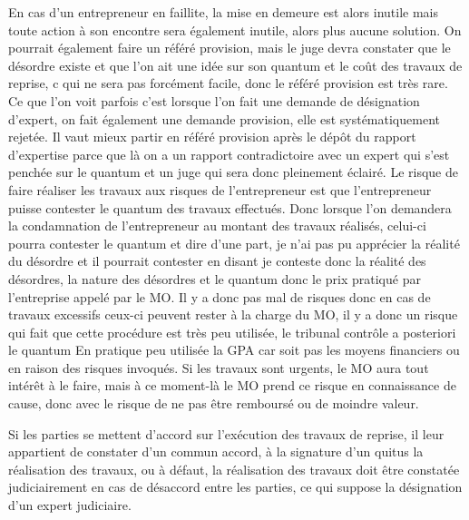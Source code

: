 				En cas d’un entrepreneur en faillite, la mise en demeure est alors inutile mais toute action à son encontre sera également inutile, alors plus aucune solution.
				On pourrait également faire un référé provision, mais le juge devra constater que le désordre existe et que l’on ait une idée sur son quantum et le coût des travaux de reprise, c qui ne sera pas forcément facile, donc le référé provision est très rare.
				Ce que l’on voit parfois c’est lorsque l’on fait une demande de désignation d’expert, on fait également une demande provision, elle est systématiquement rejetée. Il vaut mieux partir en référé provision après le dépôt du rapport d’expertise parce que là on a un rapport contradictoire avec un expert qui s’est penchée sur le quantum et un juge qui sera donc pleinement éclairé.
				Le risque de faire réaliser les travaux aux risques de l’entrepreneur est que l’entrepreneur puisse contester le quantum des travaux effectués. Donc lorsque l’on demandera la condamnation de l’entrepreneur au montant des travaux réalisés, celui-ci pourra contester le quantum et dire d’une part, je n’ai pas pu apprécier la réalité du désordre et il pourrait contester en disant je conteste donc la réalité des désordres, la nature des désordres et le quantum donc le prix pratiqué par l’entreprise appelé par le MO. Il y a donc pas mal de risques donc en cas de travaux excessifs ceux-ci peuvent rester à la charge du MO, il y a donc un risque qui fait que cette procédure est très peu utilisée, le tribunal contrôle a posteriori le quantum
				En pratique peu utilisée la GPA car soit pas les moyens financiers ou en raison des risques invoqués.
				Si les travaux sont urgents, le MO aura tout intérêt à le faire, mais à ce moment-là le MO prend ce risque en connaissance de cause, donc avec le risque de ne pas être remboursé ou de moindre valeur.

				Si les parties se mettent d’accord sur l’exécution des travaux de reprise, il leur appartient de constater d’un commun accord, à la signature d’un quitus la réalisation des travaux, ou à défaut, la réalisation des travaux doit être constatée judiciairement en cas de désaccord entre les parties, ce qui suppose la désignation d’un expert judiciaire.
